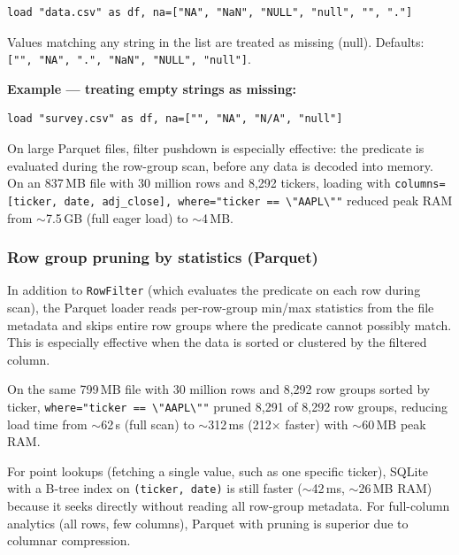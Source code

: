 \begin{lstlisting}[caption={Custom null values}]
load "data.csv" as df, na=["NA", "NaN", "NULL", "null", "", "."]
\end{lstlisting}

Values matching any string in the list are treated as missing (null). Defaults:
\texttt{["", "NA", ".", "NaN", "NULL", "null"]}.

\textbf{Example --- treating empty strings as missing:}

\begin{lstlisting}[caption={Custom nulls for survey data}]
load "survey.csv" as df, na=["", "NA", "N/A", "null"]
\end{lstlisting}

\begin{nota}
  On large Parquet files, filter pushdown is especially effective: the
  predicate is evaluated during the row-group scan, before any data is decoded
  into memory. On an 837\,MB file with 30 million rows and 8{,}292 tickers,
  loading with
  \texttt{columns=[ticker, date, adj\_close], where="ticker == \textbackslash"AAPL\textbackslash""}
  reduced peak RAM from $\sim$7.5\,GB (full eager load) to $\sim$4\,MB.
\end{nota}

\subsubsection*{Row group pruning by statistics (Parquet)}

In addition to \texttt{RowFilter} (which evaluates the predicate on each row
during scan), the Parquet loader reads per-row-group min/max statistics from
the file metadata and skips entire row groups where the predicate cannot
possibly match. This is especially effective when the data is sorted or
clustered by the filtered column.

On the same 799\,MB file with 30 million rows and 8{,}292 row groups sorted by
ticker, \texttt{where="ticker == \textbackslash"AAPL\textbackslash""} pruned
8{,}291 of 8{,}292 row groups, reducing load time from $\sim$62\,s (full scan)
to $\sim$312\,ms (212$\times$ faster) with $\sim$60\,MB peak RAM.

\begin{nota}
  For point lookups (fetching a single value, such as one specific ticker),
  SQLite with a B-tree index on \texttt{(ticker, date)} is still faster
  ($\sim$42\,ms, $\sim$26\,MB RAM) because it seeks directly without reading
  all row-group metadata. For full-column analytics (all rows, few columns),
  Parquet with pruning is superior due to columnar compression.
\end{nota}

